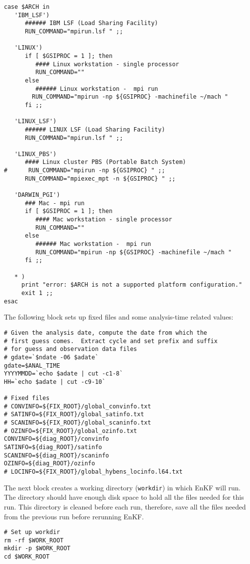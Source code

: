 \begin{scriptsize}
\begin{verbatim}
case $ARCH in
   'IBM_LSF')
      ###### IBM LSF (Load Sharing Facility)
      RUN_COMMAND="mpirun.lsf " ;;

   'LINUX')
      if [ $GSIPROC = 1 ]; then
         #### Linux workstation - single processor
         RUN_COMMAND=""
      else
         ###### Linux workstation -  mpi run
        RUN_COMMAND="mpirun -np ${GSIPROC} -machinefile ~/mach "
      fi ;;

   'LINUX_LSF')
      ###### LINUX LSF (Load Sharing Facility)
      RUN_COMMAND="mpirun.lsf " ;;

   'LINUX_PBS')
      #### Linux cluster PBS (Portable Batch System)
#      RUN_COMMAND="mpirun -np ${GSIPROC} " ;;
      RUN_COMMAND="mpiexec_mpt -n ${GSIPROC} " ;;

   'DARWIN_PGI')
      ### Mac - mpi run
      if [ $GSIPROC = 1 ]; then
         #### Mac workstation - single processor
         RUN_COMMAND=""
      else
         ###### Mac workstation -  mpi run
         RUN_COMMAND="mpirun -np ${GSIPROC} -machinefile ~/mach "
      fi ;;

   * )
     print "error: $ARCH is not a supported platform configuration."
     exit 1 ;;
esac
\end{verbatim}
\end{scriptsize}


The following block sets up fixed files and some analysis-time related values:
\begin{scriptsize}
\begin{verbatim}
# Given the analysis date, compute the date from which the
# first guess comes.  Extract cycle and set prefix and suffix
# for guess and observation data files
# gdate=`$ndate -06 $adate`
gdate=$ANAL_TIME
YYYYMMDD=`echo $adate | cut -c1-8`
HH=`echo $adate | cut -c9-10`

# Fixed files
# CONVINFO=${FIX_ROOT}/global_convinfo.txt
# SATINFO=${FIX_ROOT}/global_satinfo.txt
# SCANINFO=${FIX_ROOT}/global_scaninfo.txt
# OZINFO=${FIX_ROOT}/global_ozinfo.txt
CONVINFO=${diag_ROOT}/convinfo
SATINFO=${diag_ROOT}/satinfo
SCANINFO=${diag_ROOT}/scaninfo
OZINFO=${diag_ROOT}/ozinfo
# LOCINFO=${FIX_ROOT}/global_hybens_locinfo.l64.txt
\end{verbatim}
\end{scriptsize}

The next block creates a working directory (\verb|workdir|) in which EnKF will run. The directory should have enough disk space to hold all the files needed for this run. This directory is cleaned before each run, therefore, save all the files needed from the previous run before rerunning EnKF.
\begin{scriptsize}
\begin{verbatim}
# Set up workdir
rm -rf $WORK_ROOT
mkdir -p $WORK_ROOT
cd $WORK_ROOT
\end{verbatim}
\end{scriptsize}

